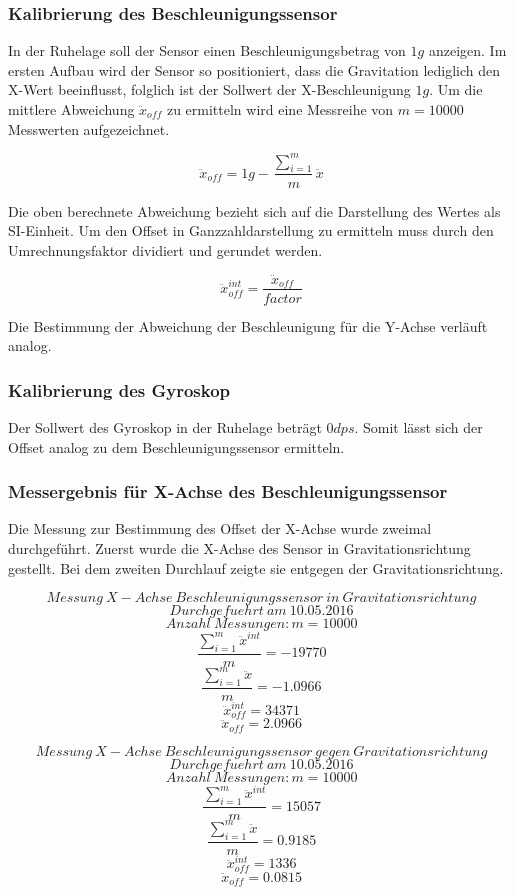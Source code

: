 \documentclass{article}
\begin{document}
\subsubsection{Kalibrierung des Beschleunigungssensor}
In der Ruhelage soll der Sensor einen Beschleunigungsbetrag von $1g$ anzeigen. Im ersten Aufbau wird der Sensor so positioniert, dass die Gravitation lediglich den X-Wert beeinflusst, folglich ist der Sollwert der X-Beschleunigung $1g$. Um die mittlere Abweichung $\ddot{x}_{off}$ zu ermitteln wird eine Messreihe von $m = 10000$ Messwerten aufgezeichnet. 

\[\ \ddot{x}_{off} = 1g - \frac{\sum_{i = 1}^{m}}{m} \ddot{x} \]

Die oben berechnete Abweichung bezieht sich auf die Darstellung des Wertes als SI-Einheit. Um den Offset in Ganzzahldarstellung zu ermitteln muss durch den Umrechnungsfaktor dividiert und gerundet werden.

\[\ \ddot{x}_{off}^{int} = \frac{\ddot{x}_{off}}{factor} \]

Die Bestimmung der Abweichung der Beschleunigung für die Y-Achse verläuft analog.

\subsubsection{Kalibrierung des Gyroskop}
Der Sollwert des Gyroskop in der Ruhelage beträgt $0 dps$. Somit lässt sich der Offset analog zu dem Beschleunigungssensor ermitteln.

\subsubsection{Messergebnis für X-Achse des Beschleunigungssensor}
Die Messung zur Bestimmung des Offset der X-Achse wurde zweimal durchgeführt. Zuerst wurde die X-Achse des Sensor in Gravitationsrichtung gestellt. Bei dem zweiten Durchlauf zeigte sie entgegen der Gravitationsrichtung.

\[\ Messung \ X-Achse \ Beschleunigungssensor \ in \ Gravitationsrichtung \]
\[\ Durchgefuehrt \ am \ 10.05.2016 \]
\[\ Anzahl \ Messungen : m = 10000 \]
\[\ \frac{\sum_{i = 1}^{m} \ddot{x}^{int}}{m} = -19770 \]
\[\ \frac{\sum_{i = 1}^{m} \ddot{x}}{m} = -1.0966 \]
\[\ \ddot{x}_{off}^{int} = 34371 \]
\[\ \ddot{x}_{off} = 2.0966 \]

\[\ Messung \ X-Achse \ Beschleunigungssensor \ gegen \ Gravitationsrichtung \]
\[\ Durchgefuehrt \ am \ 10.05.2016 \]
\[\ Anzahl \ Messungen : m = 10000 \]
\[\ \frac{\sum_{i = 1}^{m} \ddot{x}^{int}}{m} = 15057 \]
\[\ \frac{\sum_{i = 1}^{m} \ddot{x}}{m} = 0.9185 \]
\[\ \ddot{x}_{off}^{int} = 1336 \]
\[\ \ddot{x}_{off} = 0.0815 \]
\end{document}
